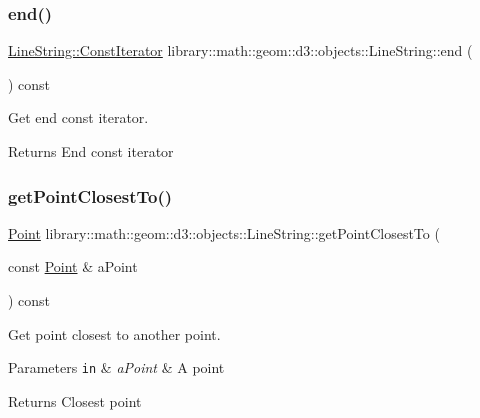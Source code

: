 \subsubsection{\texorpdfstring{end()}{end()}}
{\footnotesize\ttfamily \hyperlink{classlibrary_1_1math_1_1geom_1_1d3_1_1objects_1_1_line_string_a87db0104282f9fcccdc5b1b99e2301e5}{Line\+String\+::\+Const\+Iterator} library\+::math\+::geom\+::d3\+::objects\+::\+Line\+String\+::end (\begin{DoxyParamCaption}{ }\end{DoxyParamCaption}) const}



Get end const iterator. 

\begin{DoxyReturn}{Returns}
End const iterator 
\end{DoxyReturn}
\mbox{\label{classlibrary_1_1math_1_1geom_1_1d3_1_1objects_1_1_line_string_a39cf8a2be15c3f1686ed855659ded104}} 
\subsubsection{\texorpdfstring{get\+Point\+Closest\+To()}{getPointClosestTo()}}
{\footnotesize\ttfamily \hyperlink{classlibrary_1_1math_1_1geom_1_1d3_1_1objects_1_1_point}{Point} library\+::math\+::geom\+::d3\+::objects\+::\+Line\+String\+::get\+Point\+Closest\+To (\begin{DoxyParamCaption}\item[{const \hyperlink{classlibrary_1_1math_1_1geom_1_1d3_1_1objects_1_1_point}{Point} \&}]{a\+Point }\end{DoxyParamCaption}) const}



Get point closest to another point. 


\begin{DoxyParams}[1]{Parameters}
\mbox{\tt in}  & {\em a\+Point} & A point \\
\hline
\end{DoxyParams}
\begin{DoxyReturn}{Returns}
Closest point 
\end{DoxyReturn}
\mbox{\label{classlibrary_1_1math_1_1geom_1_1d3_1_1objects_1_1_line_string_ac635c796406d38f6f1019b64cab9b42c}} 
